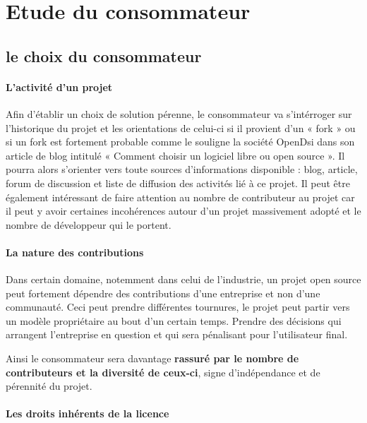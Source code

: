 	\section{Etude du consommateur} %

		\subsection{le choix du consommateur}

			\paragraph{L'activité d'un projet}

			Afin d'établir un choix de solution pérenne, le consommateur va s'intérroger sur l'historique du projet et les orientations de celui-ci si il provient d'un « \gls{fork} » ou si un fork est fortement probable comme le souligne la société OpenDsi dans son article de blog intitulé « Comment choisir un logiciel libre ou open source ».
			Il pourra alors s'orienter vers toute sources d'informations disponible : blog, article, forum de discussion et liste de diffusion des activités lié à ce projet. Il peut être également intéressant de faire attention au nombre de contributeur au projet car il peut y avoir certaines incohérences autour d'un projet massivement adopté et le nombre de développeur qui le portent.

			\paragraph{La nature des contributions}

			Dans certain domaine, notemment dans celui de l'industrie, un projet open source peut fortement dépendre des contributions d'une entreprise et non d'une communauté. Ceci peut prendre différentes tournures, le projet peut partir vers un modèle propriétaire au bout d'un certain temps. Prendre des décisions qui arrangent l'entreprise en question et qui sera pénalisant pour l'utilisateur final. 

			Ainsi le consommateur sera davantage \textbf{rassuré par le nombre de contributeurs et la diversité de ceux-ci}, signe d'indépendance et de pérennité du projet.

			\paragraph{Les droits inhérents de la licence}

